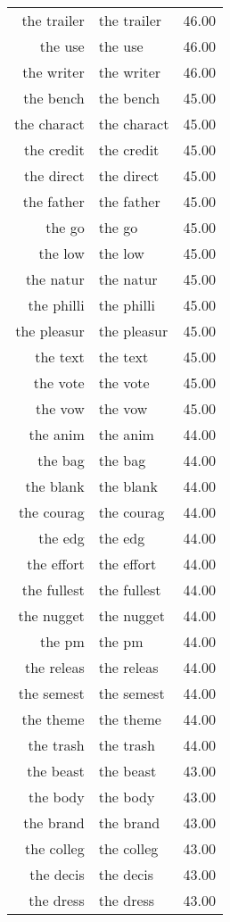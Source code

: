 \begin{table}[ht]
\begin{tabular}{rlr}
  the trailer & the trailer & 46.00 \\ 
  the use & the use & 46.00 \\ 
  the writer & the writer & 46.00 \\ 
  the bench & the bench & 45.00 \\ 
  the charact & the charact & 45.00 \\ 
  the credit & the credit & 45.00 \\ 
  the direct & the direct & 45.00 \\ 
  the father & the father & 45.00 \\ 
  the go & the go & 45.00 \\ 
  the low & the low & 45.00 \\ 
  the natur & the natur & 45.00 \\ 
  the philli & the philli & 45.00 \\ 
  the pleasur & the pleasur & 45.00 \\ 
  the text & the text & 45.00 \\ 
  the vote & the vote & 45.00 \\ 
  the vow & the vow & 45.00 \\ 
  the anim & the anim & 44.00 \\ 
  the bag & the bag & 44.00 \\ 
  the blank & the blank & 44.00 \\ 
  the courag & the courag & 44.00 \\ 
  the edg & the edg & 44.00 \\ 
  the effort & the effort & 44.00 \\ 
  the fullest & the fullest & 44.00 \\ 
  the nugget & the nugget & 44.00 \\ 
  the pm & the pm & 44.00 \\ 
  the releas & the releas & 44.00 \\ 
  the semest & the semest & 44.00 \\ 
  the theme & the theme & 44.00 \\ 
  the trash & the trash & 44.00 \\ 
  the beast & the beast & 43.00 \\ 
  the body & the body & 43.00 \\ 
  the brand & the brand & 43.00 \\ 
  the colleg & the colleg & 43.00 \\ 
  the decis & the decis & 43.00 \\ 
  the dress & the dress & 43.00 \\ 

\end{tabular}
\end{table}
